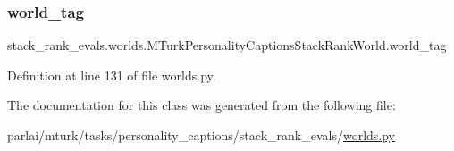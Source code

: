 \subsubsection{\texorpdfstring{world\+\_\+tag}{world\_tag}}
{\footnotesize\ttfamily stack\+\_\+rank\+\_\+evals.\+worlds.\+M\+Turk\+Personality\+Captions\+Stack\+Rank\+World.\+world\+\_\+tag}



Definition at line 131 of file worlds.\+py.



The documentation for this class was generated from the following file\+:\begin{DoxyCompactItemize}
\item 
parlai/mturk/tasks/personality\+\_\+captions/stack\+\_\+rank\+\_\+evals/\hyperlink{parlai_2mturk_2tasks_2personality__captions_2stack__rank__evals_2worlds_8py}{worlds.\+py}\end{DoxyCompactItemize}
